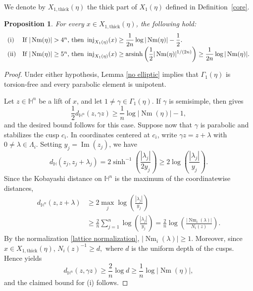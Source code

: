 \documentclass[12 pt]{amsart}
\newtheorem{Proposition}[theorem]{Proposition}
\theoremstyle{definition}
\newcommand{\Nm}{\operatorname{Nm}}
\newcommand{\Hu}{\mathbb{H}}
\begin{document}
We denote by \(X_{1,\mathrm{thick}}(\eta)\) the thick part of \(X_1(\eta)\) defined in Definition~\ref{core}.

\begin{Proposition}\label{inj thick}
For every \(x\in X_{1,\mathrm{thick}}(\eta)\), the following hold:
\[
\begin{array}{ll}
\mathrm{(i)}&\text{If \( |\Nm(\eta)|> 4^n\), then }
\displaystyle\operatorname{inj}_{X_1(\eta)}(x)\ge\frac{1}{2n}\log|\Nm(\eta)|-\frac12.\\[4pt]
\mathrm{(ii)}&\text{If \( |\Nm(\eta)|\ge5^n\), then }
\displaystyle\operatorname{inj}_{X_1(\eta)}(x)
\ge
\operatorname{arsinh}\left(\frac12|\Nm(\eta)|^{1/(2n)}\right)
\ge
\frac{1}{2n}\log|\Nm(\eta)|.
\end{array}
\]
\end{Proposition}
\begin{proof}
Under either hypothesis, Lemma \ref{no elliptic} implies that $\Gamma_1(\eta)$ is torsion-free and every parabolic element is unipotent.

Let \(z\in\Hu^n\) be a lift of \(x\), and let
\(1\ne\gamma\in\Gamma_1(\eta)\). If \(\gamma\) is semisimple, then
\cite[Corollary~3.10]{bakker2018geometric} gives
\[
\frac12d_{\Hu^n}(z,\gamma z)
\ge \frac1n\log|\Nm(\eta)|-1,
\]
and the desired bound follows for this case. Suppose now that \(\gamma\) is parabolic and stabilizes the cusp \(c_i\).
In coordinates centered at \(c_i\), write
\(
\gamma z=z+\lambda
\)
with \(0\ne\lambda\in\Lambda_i\). Setting
\(y_j=\operatorname{Im}(z_j)\), we have
\[
d_{\Hu}(z_j,z_j+\lambda_j)
=
2\sinh^{-1}\left(\frac{|\lambda_j|}{2y_j}\right)
\ge
2\log\left(\frac{|\lambda_j|}{y_j}\right).
\]
Since the Kobayashi distance on \(\Hu^n\) is the maximum of the
coordinatewise distances,
\begin{align*}
d_{\Hu^n}(z,z+\lambda)
&\ge
2\max_j\log\left(\frac{|\lambda_j|}{y_j}\right)\\
&\ge
\frac{2}{n}\sum_{j=1}^n
\log\left(\frac{|\lambda_j|}{y_j}\right)
=
\frac{2}{n}
\log\left(\frac{|\Nm_i(\lambda)|}{N_i(z)}\right).
\end{align*}
By the normalization \eqref{lattice normalization},
\(
|\Nm_i(\lambda)|\ge1.
\)
Moreover, since \(x\in X_{1,\mathrm{thick}}(\eta)\),
\(
N_i(z)^{-1}\ge d,
\)
where \(d\) is the uniform depth of the cusps. Hence
\cite[Corollary~3.5]{bakker2018geometric} yields
\[
d_{\Hu^n}(z,\gamma z)
\ge\frac{2}{n}\log d
\ge\frac{1}{n}\log|\Nm(\eta)|,
\]
and the claimed bound for (i) follows.


\end{proof}
\end{document}
